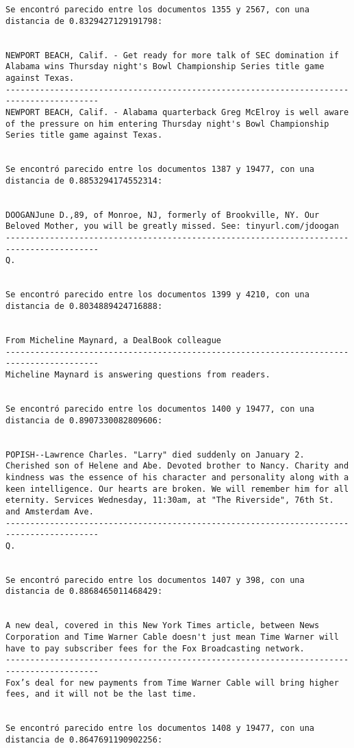 \documentclass[11pt]{article}
\begin{document}
\begin{Verbatim}[commandchars=\\\{\}]
Se encontró parecido entre los documentos 1355 y 2567, con una distancia de 0.8329427129191798:


NEWPORT BEACH, Calif. - Get ready for more talk of SEC domination if Alabama wins Thursday night's Bowl Championship Series title game against Texas.
-----------------------------------------------------------------------------------------
NEWPORT BEACH, Calif. - Alabama quarterback Greg McElroy is well aware of the pressure on him entering Thursday night's Bowl Championship Series title game against Texas.


Se encontró parecido entre los documentos 1387 y 19477, con una distancia de 0.8853294174552314:


DOOGANJune D.,89, of Monroe, NJ, formerly of Brookville, NY. Our Beloved Mother, you will be greatly missed. See: tinyurl.com/jdoogan
-----------------------------------------------------------------------------------------
Q.


Se encontró parecido entre los documentos 1399 y 4210, con una distancia de 0.8034889424716888:


From Micheline Maynard, a DealBook colleague
-----------------------------------------------------------------------------------------
Micheline Maynard is answering questions from readers.


Se encontró parecido entre los documentos 1400 y 19477, con una distancia de 0.8907330082809606:


POPISH--Lawrence Charles. "Larry" died suddenly on January 2. Cherished son of Helene and Abe. Devoted brother to Nancy. Charity and kindness was the essence of his character and personality along with a keen intelligence. Our hearts are broken. We will remember him for all eternity. Services Wednesday, 11:30am, at "The Riverside", 76th St. and Amsterdam Ave.
-----------------------------------------------------------------------------------------
Q.


Se encontró parecido entre los documentos 1407 y 398, con una distancia de 0.8868465011468429:


A new deal, covered in this New York Times article, between News Corporation and Time Warner Cable doesn't just mean Time Warner will have to pay subscriber fees for the Fox Broadcasting network.
-----------------------------------------------------------------------------------------
Fox’s deal for new payments from Time Warner Cable will bring higher fees, and it will not be the last time.


Se encontró parecido entre los documentos 1408 y 19477, con una distancia de 0.8647691190902256:



\end{Verbatim}
\end{document}
